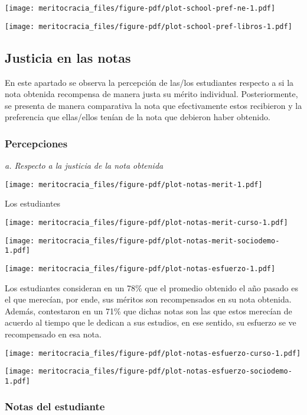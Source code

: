 \documentclass[
  letterpaper,
  DIV=11,
  numbers=noendperiod]{scrreprt}
\begin{document}
\texttt{[image: meritocracia\_files/figure-pdf/plot-school-pref-ne-1.pdf]}

\texttt{[image: meritocracia\_files/figure-pdf/plot-school-pref-libros-1.pdf]}

\subsection{Justicia en las notas}\label{justicia-en-las-notas}

En este apartado se observa la percepción de las/los estudiantes
respecto a si la nota obtenida recompensa de manera justa su mérito
individual. Posteriormente, se presenta de manera comparativa la nota
que efectivamente estos recibieron y la preferencia que ellas/ellos
tenían de la nota que debieron haber obtenido.

\subsubsection{Percepciones}\label{percepciones-2}

\emph{a. Respecto a la justicia de la nota obtenida}

\texttt{[image: meritocracia\_files/figure-pdf/plot-notas-merit-1.pdf]}

Los estudiantes

\texttt{[image: meritocracia\_files/figure-pdf/plot-notas-merit-curso-1.pdf]}

\texttt{[image: meritocracia\_files/figure-pdf/plot-notas-merit-sociodemo-1.pdf]}

\texttt{[image: meritocracia\_files/figure-pdf/plot-notas-esfuerzo-1.pdf]}

Los estudiantes consideran en un 78\% que el promedio obtenido el año
pasado es el que merecían, por ende, sus méritos son recompensados en su
nota obtenida. Además, contestaron en un 71\% que dichas notas son las
que estos merecían de acuerdo al tiempo que le dedican a sus estudios,
en ese sentido, su esfuerzo se ve recompensado en esa nota.

\texttt{[image: meritocracia\_files/figure-pdf/plot-notas-esfuerzo-curso-1.pdf]}

\texttt{[image: meritocracia\_files/figure-pdf/plot-notas-esfuerzo-sociodemo-1.pdf]}

\subsubsection{Notas del estudiante}\label{notas-del-estudiante}
\end{document}
